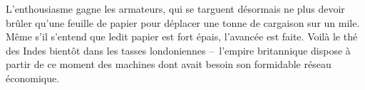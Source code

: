 	L’enthousiasme gagne les armateurs, qui se targuent désormais ne plus devoir brûler qu’une feuille de papier pour déplacer une tonne de cargaison sur un mile. Même s’il s’entend que ledit papier est fort épais, l’avancée est faite. Voilà le thé des Indes bientôt dans les tasses londoniennes --\ l’empire britannique dispose à partir de ce moment des machines dont avait besoin son formidable réseau économique.
\atendofhistorysection
